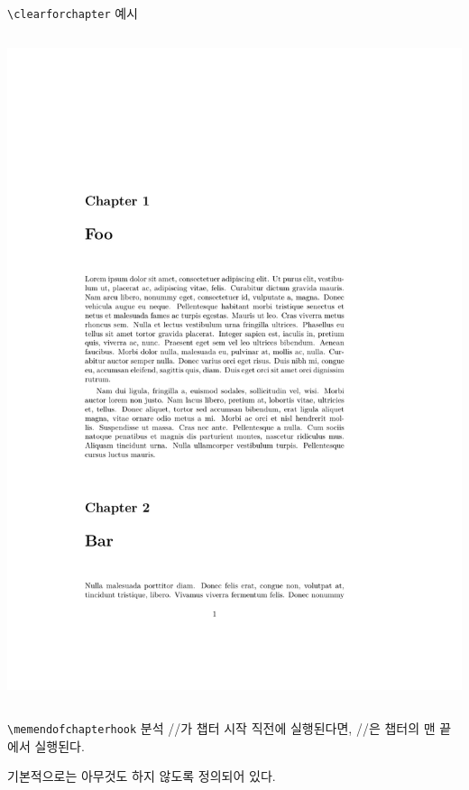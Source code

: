 \documentclass{beamer}
\def\tbs{\textbackslash}
\begin{document}
\begin{frame}[fragile]{\texttt{\tbs clearforchapter} 예시}
\begin{columns}
    \begin{column}{0.4\textwidth}
      \includegraphics[frame,page=2,width=\linewidth]{clearforchapter}
    \end{column}
  \end{columns}
\end{frame}

\begin{frame}[fragile]{\texttt{\tbs memendofchapterhook} 분석}
  \ltxverb/\clearforchapter/가 챕터 시작 직전에 실행된다면,
  \ltxverb/\memendofchapterhook/은 챕터의 맨 끝에서 실행된다.

  기본적으로는 아무것도 하지 않도록 정의되어 있다.
\end{frame}
\end{document}
